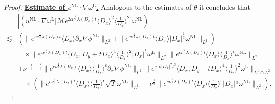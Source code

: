 \documentclass[reqno, 12pt]{amsart} %
\theoremstyle{plain} %
\theoremstyle{definition}
\theoremstyle{remark}
\numberwithin{equation}{section} %
\newcommand{\lt}{\left}
\newcommand{\rt}{\right}
\begin{document}
\begin{proof}
		\underline{\bf Estimate of $  u^{\mathrm{NL}} \cdot  \nabla \omega^{\mathrm{L}}$.} Analogous to the estimates of $\theta$ it concludes that
		\begin{equation*}\begin{aligned}
				&\left|\left(u^{\mathrm{NL}} \cdot \nabla \omega^{\mathrm{L}} \big| \mathcal{M} e^{2 c \nu^{\frac{1}{3}} \lambda\left(D_x\right) t}\langle D_x\rangle^2\langle\frac{1}{D_x}\rangle^{2 \epsilon} \omega^{\mathrm{NL}} \right)\right| \\
				\lesssim &  \lt( \|e^{c \nu^{\frac{1}{3}} \lambda\left(D_x\right) t}\langle D_x\rangle \partial_x \nabla \phi^{\mathrm{NL}}\|_{L^2} + \|e^{c \nu^{\frac{1}{3}} \lambda\left(D_x\right) t}\langle D_x\rangle\left|D_x\right|^{\frac{1}{3}} \omega^{\mathrm{NL}}\|_{L^2} \rt) \\
				&\quad  \times\|e^{c \nu^{\frac{1}{3}} \lambda\left(D_x\right) t}\langle D_x, D_y+t D_x\rangle^4\langle\frac{1}{D_x}\rangle^2\left|D_x\right|^{\frac{1}{3}} \omega^{\mathrm{L}}\|_{L^2} \|e^{c \nu^{\frac{1}{3}} \lambda\left(D_x\right) t}\langle D_x\rangle  \langle\frac{1}{D_x}\rangle^\epsilon \omega^{\mathrm{NL}}\|_{L^2} \\
				&  + \nu^{-\frac{1}{3}-\frac{\delta}{6}}\|e^{c \nu^{\frac{1}{3}} \lambda\left(D_x\right)}\langle D_x\rangle\langle\frac{1}{D_x}\rangle^\epsilon \partial_x \nabla \phi^{\mathrm{NL}}\|_{L^2}\|e^{c_0 \nu\left|D_x\right|^2 t^3}\langle D_x, D_y+t D_x\rangle^4\langle\frac{1}{D_x}\rangle^2 \omega^{\mathrm{L}}\|_{L^1 \cap L^2} \\
				&\quad  \times\left(\|e^{c \nu^{\frac{1}{3}} \lambda\left(D_x\right) t}\langle D_x\rangle\langle\frac{1}{D_x}\rangle^\epsilon \sqrt{\Upsilon} \omega^{\mathrm{NL}}\|_{L^2}+\nu^{\frac{1}{6}}\|e^{c \nu^{\frac{1}{3}} \lambda\left(D_x\right) t}\langle D_x\rangle\langle\frac{1}{D_x}\rangle^\epsilon |D_x|^\frac13 \omega^{\mathrm{NL}}\|_{L^2}\right).
		\end{aligned}\end{equation*}
		

\end{proof}
\end{document}
